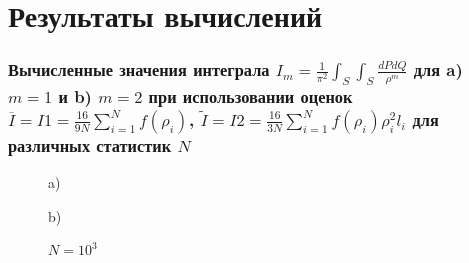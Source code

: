 \documentclass[
11pt,
master, %
subf, %
href, %
colorlinks=true, %
times, %
]{disser}
\begin{document}
\newpage
\section{Результаты вычислений}
\subsubsection{Вычисленные значения интеграла $\displaystyle I_m = \frac{1}{\pi^2}\int_S\int_S \frac{dP dQ}{\rho^m}$ для a) $m=1$ и b) $m=2$ при использовании оценок $\displaystyle\overline{I}= I1 = \frac{16}{9N}\sum_{i=1}^{N}f(\rho_i)$, $\displaystyle\tilde{I} = I2 = \frac{16}{3N}\sum_{i=1}^{N}f(\rho_i)\rho_i^2 l_i$ для различных статистик $N$}
\begin{figure}[h]
\begin{minipage}[h]{0.48\linewidth}
 a) \\
\end{minipage}
\hfill
\begin{minipage}[h]{0.48\linewidth}
 b) \\
\end{minipage}
\caption{$N = 10^3$}
\label{ris:3}
\end{figure}
\end{document}

